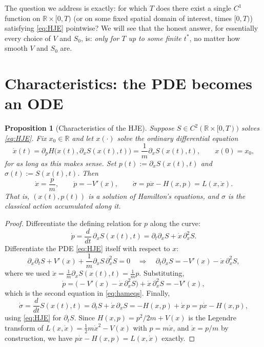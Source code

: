 \documentclass[11pt]{article}
\theoremstyle{plain}
\newtheorem{proposition}[theorem]{Proposition}
\theoremstyle{definition}
\theoremstyle{remark}
\begin{document}
The question we address is exactly: for which $T$ does there exist a single
$C^1$ function on $\mathbb{R}\times[0,T)$ (or on some fixed spatial domain of
interest, times $[0,T)$) satisfying \eqref{eq:HJE} pointwise? We will see that
the honest answer, for essentially every choice of $V$ and $S_0$, is:
\emph{only for $T$ up to some finite $t^\ast$}, no matter how smooth $V$ and
$S_0$ are.

\section{Characteristics: the PDE becomes an ODE}
\label{sec:characteristics}

\begin{proposition}[Characteristics of the HJE]
\label{prop:characteristics}
Suppose $S\in C^2(\mathbb{R}\times[0,T))$ solves \eqref{eq:HJE}. Fix
    $x_0\in\mathbb{R}$ and let $x(\cdot)$ solve the ordinary differential
    equation
\[
\dot x(t) = \partial_pH\big(x(t),\partial_xS(x(t),t)\big) =
    \frac{1}{m}\partial_xS(x(t),t), \qquad x(0)=x_0,
\]
for as long as this makes sense. Set $p(t):=\partial_xS(x(t),t)$ 
    and $\sigma(t):=S(x(t),t)$. Then
\begin{equation}
\dot x = \frac{p}{m}, \qquad \dot p = -V'(x), 
    \qquad \dot\sigma = p\dot x - H(x,p) = L(x,\dot x).
\label{eq:hameqs}
\end{equation}
That is, $(x(t),p(t))$ is a solution of Hamilton's equations, and $\sigma$ is
    the classical action accumulated along it.
\end{proposition}

\begin{proof}
Differentiate the defining relation for $p$ along the curve:
\[
\dot p = \frac{d}{dt}\,\partial_xS(x(t),t) = \partial_t\partial_xS +
    \dot x\,\partial_x^2 S.
\]
Differentiate the PDE \eqref{eq:HJE} itself with respect to $x$:
\[
\partial_x\partial_tS + V'(x) + \frac{1}{m}\partial_xS\,\partial_x^2S = 0
\quad\Longrightarrow\quad
\partial_t\partial_xS = -V'(x) - \dot x\,\partial_x^2S,
\]
where we used $\dot x = \frac1m\partial_xS(x(t),t)=\frac1m p$. Substituting,
\[
\dot p = \big(-V'(x)-\dot x\,\partial_x^2S\big) + \dot x\,\partial_x^2S = -V'(x),
\]
which is the second equation in \eqref{eq:hameqs}. Finally,
\[
\dot\sigma = \frac{d}{dt}S(x(t),t) = \partial_tS + \dot x\,\partial_xS = -H(x,p) + \dot x\,p = p\dot x - H(x,p),
\]
using \eqref{eq:HJE} for $\partial_tS$. Since $H(x,p)=p^2/2m+V(x)$ is the Legendre transform of $L(x,\dot x)=\tfrac12m\dot x^2-V(x)$ with $p=m\dot x$, and $\dot x=p/m$ by construction, we have $p\dot x-H(x,p)=L(x,\dot x)$ exactly.
\end{proof}
\end{document}
